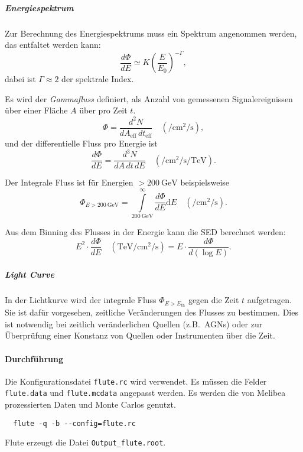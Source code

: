 \subparagraph{Energiespektrum}

Zur Berechnung des Energiespektrums muss ein Spektrum angenommen werden,
das entfaltet werden kann:
\begin{equation}%
  \label{eq:photon_index}
  \frac{d\Phi}{dE} \simeq K {\left(\frac{E}{E_0}\right)}^{-\Gamma},
\end{equation}
dabei ist $\Gamma \approx 2$ der spektrale Index.

Es wird der \textit{Gammafluss} definiert,
als Anzahl von gemessenen Signalereignissen
über
einer Fläche $A$ über pro Zeit $t$.
\begin{equation}%
  \label{eq:gamma_flux}
  \Phi = \frac{d^2 N}{dA_{\text{eff}}\, dt_{\text{eff}}}
  \quad \left(\si{\per\centi\meter\tothe2\per\second}\right),
\end{equation}
und der differentielle Fluss pro Energie ist
\begin{equation}%
  \label{eq:differential_energy_spectrum}
  \frac{d\Phi}{dE} = \frac{d^3N}{dA\, dt\, dE}
  \quad \left(\si{\per\centi\meter\tothe2\per\second\per\tera\electronvolt}\right).
\end{equation}

Der Integrale Fluss ist für Energien $> \SI{200}{\giga\electronvolt}$
beispielsweise
\begin{equation}%
  \label{eq:integral_flux}
  \Phi_{E > \SI{200}{\giga\electronvolt}} =
    \int\limits_{\SI{200}{\giga\electronvolt}}^{\infty} \frac{d \Phi}{dE}
    \text{d} E
  \quad \left(\si{\per\centi\meter\tothe2\per\second}\right).
\end{equation}

Aus dem Binning des Flusses in der Energie
kann die SED berechnet werden:
\begin{equation}%
  \label{eq:spectral_energy_distribution}
  E^2 \cdot \frac{d \Phi}{dE}
  \quad \left(\si{\tera\electronvolt\per\centi\meter\tothe2\per\second}\right)
  = E \cdot \frac{d \Phi}{d \left(\log E\right)}.
\end{equation}

\subparagraph{Light Curve}
In der Lichtkurve wird
der integrale Fluss $\Phi_{E > E_\text{th}}$ gegen die Zeit $t$
aufgetragen.
Sie ist dafür vorgesehen,
zeitliche Veränderungen des Flusses zu bestimmen.
Dies ist notwendig bei zeitlich veränderlichen Quellen
(z.B.\ AGNs)
oder zur Überprüfung einer Konstanz von Quellen oder Instrumenten
über die Zeit.



\paragraph{Durchführung}%

Die Konfigurationsdatei \texttt{flute.rc} wird verwendet.
Es müssen die Felder \texttt{flute.data} und \texttt{flute.mcdata} angepasst werden.
Es werden die von Melibea prozessierten Daten und Monte Carlos genutzt.


\begin{lstlisting}
  flute -q -b --config=flute.rc
\end{lstlisting}

Flute erzeugt die Datei \texttt{Output\_flute.root}.
